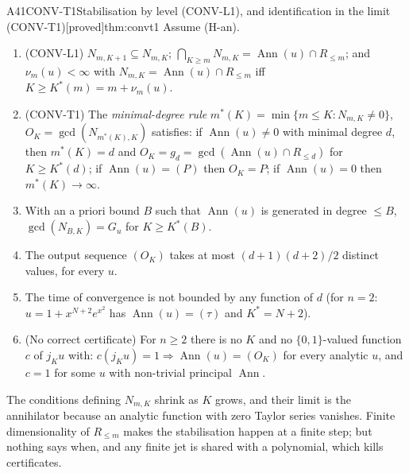 \documentclass[11pt,a4paper,oneside]{report}
\newcommand{\badge}[2]{\textcolor{#1}{\textsf{\footnotesize[#2]}}}
\newcommand{\proved}{\badge{cC}{proved}}
\newcommand{\Ann}{\operatorname{Ann}}
\newenvironment{dimcard}[5]{\par\Needspace{12\baselineskip}\begin{dimcardbox}{#1}{#2}{#3}{#4}{#5}}{\end{dimcardbox}}
\begin{document}
\begin{dimcard}{A41}{CONV-T1}{Stabilisation by level (CONV-L1), and identification in the limit (CONV-T1)}{\proved}{thm:convt1}
Assume (H-an).
\begin{enumerate}[label=(\alph*)]
\item (CONV-L1) $N_{m,K+1}\subseteq N_{m,K}$; $\bigcap_{K\ge m}N_{m,K}=\Ann(u)\cap R_{\le m}$; and $\nu_m(u)<\infty$ with $N_{m,K}=\Ann(u)\cap R_{\le m}$ iff $K\ge K^*(m)=m+\nu_m(u)$.
\item (CONV-T1) The \emph{minimal-degree rule} $m^*(K)=\min\{m\le K:N_{m,K}\ne0\}$, $O_K=\gcd(N_{m^*(K),K})$ satisfies: if $\Ann(u)\ne0$ with minimal degree $d$, then $m^*(K)=d$ and $O_K=g_d=\gcd(\Ann(u)\cap R_{\le d})$ for $K\ge K^*(d)$; if $\Ann(u)=(P)$ then $O_K=P$; if $\Ann(u)=0$ then $m^*(K)\to\infty$.
\item With an a priori bound $B$ such that $\Ann(u)$ is generated in degree $\le B$, $\gcd(N_{B,K})=G_u$ for $K\ge K^*(B)$.
\item The output sequence $(O_K)$ takes at most $(d+1)(d+2)/2$ distinct values, for every $u$.
\item The time of convergence is not bounded by any function of $d$ (for $n=2$: $u=1+x^{N+2}e^{x^2}$ has $\Ann(u)=(\tau)$ and $K^*=N+2$).
\item (No correct certificate) For $n\ge2$ there is no $K$ and no $\{0,1\}$-valued function $c$ of $j_Ku$ with: $c(j_Ku)=1\Rightarrow\Ann(u)=(O_K)$ for every analytic $u$, and $c=1$ for some $u$ with non-trivial principal $\Ann$.
\end{enumerate}
\end{dimcard}

\begin{proofidea}
The conditions defining $N_{m,K}$ shrink as $K$ grows, and their limit is the annihilator because an analytic function with zero Taylor series vanishes. Finite dimensionality of $R_{\le m}$ makes the stabilisation happen at a finite step; but nothing says when, and any finite jet is shared with a polynomial, which kills certificates.
\end{proofidea}
\end{document}
